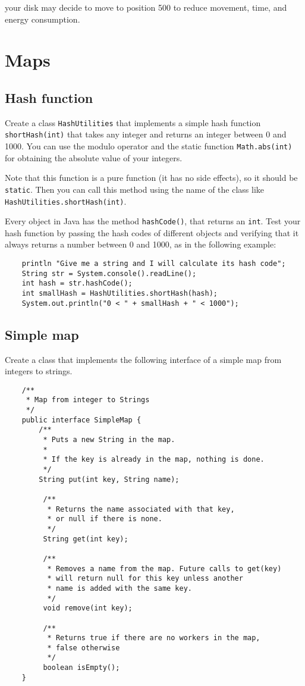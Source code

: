 \documentclass{article}
\begin{document}
your disk may decide to move to position
500 to reduce movement, time, and energy consumption.

\section{Maps}
\label{sec:using-maps}

\subsection{Hash function}
\label{sec:hash-function}

Create a class \verb+HashUtilities+ that implements a simple hash
function \verb+shortHash(int)+ that takes any integer and returns an
integer between 0 and 1000. You can use the modulo operator and the
static function \verb+Math.abs(int)+ for obtaining the absolute value
of your integers. 

Note that this function is a pure function (it has no side effects),
so it should be \verb+static+. Then you can call this method using the
name of the class like \verb+HashUtilities.shortHash(int)+. 

Every object in Java has the method \verb+hashCode()+, that returns an
\verb+int+. Test your hash function by passing the hash codes of
different objects and verifying that it always returns a number
between 0 and 1000, as in the following example:

\begin{verbatim}
    println "Give me a string and I will calculate its hash code";
    String str = System.console().readLine(); 
    int hash = str.hashCode();
    int smallHash = HashUtilities.shortHash(hash);
    System.out.println("0 < " + smallHash + " < 1000");
\end{verbatim}

\subsection{Simple map}
\label{sec:simple-map-1}

Create a class that implements the following interface of a simple map
from integers to strings. 

\begin{verbatim}
    /**
     * Map from integer to Strings
     */
    public interface SimpleMap {
        /**
         * Puts a new String in the map. 
         * 
         * If the key is already in the map, nothing is done.
         */
        String put(int key, String name);
    
         /**
          * Returns the name associated with that key, 
          * or null if there is none.
          */
         String get(int key);
    
         /**
          * Removes a name from the map. Future calls to get(key) 
          * will return null for this key unless another 
          * name is added with the same key.
          */
         void remove(int key);
    
         /** 
          * Returns true if there are no workers in the map, 
          * false otherwise
          */
         boolean isEmpty();
    }
\end{verbatim}
\end{document}
